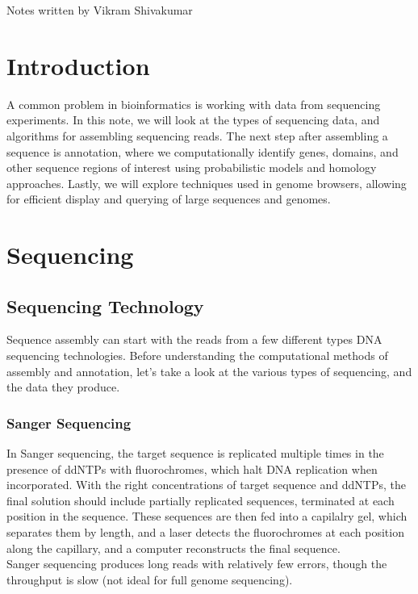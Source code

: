\documentclass[12pt]{article}
\begin{document}
\thispagestyle{plain}
   \newpage
   \setcounter{page}{1}
   \noindent
   \begin{center}
   \end{center}
   {Notes written by Vikram Shivakumar}
   \vspace*{4mm}


\section{Introduction}
A common problem in bioinformatics is working with data from sequencing experiments. In this note, we will look at the types of sequencing data, and algorithms for assembling sequencing reads. The next step after assembling a sequence is annotation, where we computationally identify genes, domains, and other sequence regions of interest using probabilistic models and homology approaches. Lastly, we will explore techniques used in genome browsers, allowing for efficient display and querying of large sequences and genomes.
\section{Sequencing}
\subsection{Sequencing Technology}
Sequence assembly can start with the reads from a few different types DNA sequencing technologies. Before understanding the computational methods of assembly and annotation, let's take a look at the various types of sequencing, and the data they produce.
\subsubsection{Sanger Sequencing}
In Sanger sequencing, the target sequence is replicated multiple times in the presence of ddNTPs with fluorochromes, which halt DNA replication when incorporated. With the right concentrations of target sequence and ddNTPs, the final solution should include partially replicated sequences, terminated at each position in the sequence. These sequences are then fed into a capilalry gel, which separates them by length, and a laser detects the fluorochromes at each position along the capillary, and a computer reconstructs the final sequence.\\[10pt]
Sanger sequencing produces long reads with relatively few errors, though the throughput is slow (not ideal for full genome sequencing).
\end{document}
